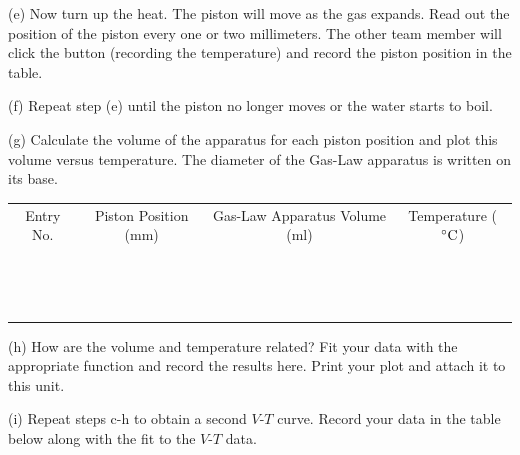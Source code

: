 (e) Now turn up the heat. The piston will move as the gas expands.
Read out the position of the piston every one or two millimeters. The other team member
will click the  button (recording the temperature) and record the piston position
in the table.

(f) Repeat step (e) until the piston no longer moves or the water starts to boil.
 
(g) Calculate the volume of the apparatus for each piston position and plot
this volume versus temperature. The diameter of the Gas-Law apparatus is written on its
base.

\vspace{0.3cm}
\begin{center}
{\renewcommand{\arraystretch}{1.1}
\begin{tabular}{|c|c|c|c|}
\hline 
Entry No.&
Piston Position (mm)&
Gas-Law Apparatus Volume (ml)&
Temperature ($^\circ  \rm C$)\\
\hhline{|=|=|=|=|}
& & & \\
\hline 
& & & \\
\hline 
& & & \\
\hline 
& & & \\
\hline 
& & & \\
\hline 
& & & \\
\hline 
& & & \\
\hline 
& & & \\
\hline 
& & & \\
\hline 
& & & \\
\hline 
& & & \\
\hline 
& & & \\
\hline 
& & & \\
\hline 
& & & \\
\hline 
\end{tabular}\par}
\end{center}
\vspace{0.3cm}

(h) How are the volume and temperature related?
Fit your data with the appropriate function and record the results here.
Print your plot and attach it to this unit.
\vspace{15mm}

\pagebreak[2]
(i) Repeat steps c-h to obtain a second $V$-$T$ curve. Record your data in the table below
along with the fit to the $V$-$T$ data.

